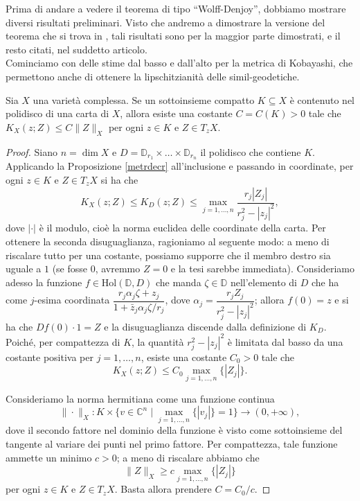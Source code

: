 Prima di andare a vedere il teorema di tipo ``Wolff-Denjoy'', dobbiamo mostrare diversi risultati preliminari. Visto che andremo a dimostrare la versione del teorema che si trova in \cite{CMS}, tali risultati sono per la maggior parte dimostrati, e il resto citati, nel suddetto articolo. \\

Cominciamo con delle stime dal basso e dall'alto per la metrica di Kobayashi, che permettono anche di ottenere la lipschitzianità delle simil-geodetiche.

\begin{lm} \label{polycpt}
    Sia $X$ una varietà complessa. Se un sottoinsieme compatto $K\subseteq X$ è contenuto nel polidisco di una carta di $X$, allora esiste una costante $C=C(K)>0$ tale che $K_X(z;Z) \le C\|Z\|_X$ per ogni $z \in K$ e $Z \in T_zX$.
\end{lm}

\begin{proof}
    Siano $n=\dim{X}$ e $D=\mathbb{D}_{r_1}\times\dots\times\mathbb{D}_{r_n}$ il polidisco che contiene $K$. Applicando la Proposizione \ref{metrdecr} all'inclusione e passando in coordinate, per ogni $z \in K$ e $Z \in T_zX$ si ha che
    $$K_X(z;Z) \le K_D(z;Z) \le \max_{j=1,\dots,n} \frac{r_j|Z_j|}{r_j^2-|z_j|^2},$$
    dove $|\cdot|$ è il modulo, cioè la norma euclidea delle coordinate della carta. Per ottenere la seconda disuguaglianza, ragioniamo al seguente modo: a meno di riscalare tutto per una costante, possiamo supporre che il membro destro sia uguale a $1$ (se fosse $0$, avremmo $Z=0$ e la tesi sarebbe immediata). Consideriamo adesso la funzione $f\in\text{Hol}(\mathbb{D},D)$ che manda $\zeta\in\mathbb{D}$ nell'elemento di $D$ che ha come $j$-esima coordinata $\dfrac{r_j\alpha_j\zeta+z_j}{1+\bar{z}_j\alpha_j\zeta/r_j}$, dove $\alpha_j=\dfrac{r_jZ_j}{r_j^2-|z_j|^2}$; allora $f(0)=z$ e si ha che $Df(0)\cdot 1=Z$ e la disuguaglianza discende dalla definizione di $K_D$. Poiché, per compattezza di $K$, la quantità $r_j^2-|z_j|^2$ è limitata dal basso da una costante positiva per $j=1,\dots,n$, esiste una costante $C_0>0$ tale che
    $$K_X(z;Z) \le C_0\max_{j=1,\dots,n}\{|Z_j|\}.$$
    
    
    Consideriamo la norma hermitiana come una funzione continua
    $$\|\cdot\|_X:K\times\big\{v\in\mathbb{C}^n\mid\max_{j=1,\dots,n}\{|v_j|\}=1\big\}\longrightarrow (0,+\infty),$$
    dove il secondo fattore nel dominio della funzione è visto come sottoinsieme del tangente al variare dei punti nel primo fattore. Per compattezza, tale funzione ammette un minimo $c>0$; a meno di riscalare abbiamo che
    $$\|Z\|_X \ge c\max_{j=1,\dots,n}\{|Z_j|\}$$
    per ogni $z\in K$ e $Z\in T_zX$. Basta allora prendere $C=C_0/c$.
\end{proof}

